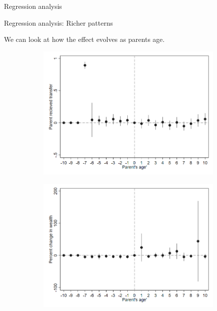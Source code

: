 \documentclass[10pt]{beamer}
\begin{document}
\begin{frame}{Regression analysis}
    \begin{adjustbox}{width=.9\textwidth}
    
    \end{adjustbox}
    
\end{frame}

\begin{frame}{Regression analysis: Richer patterns}

We can look at how the effect evolves as parents age. 

\begin{figure}[h!]
\begin{subfigure}[t]{.48\textwidth}
  \includegraphics[width=\textwidth]{OLS_Transfer.png}
\end{subfigure}%
\hfill
\begin{subfigure}[t]{.48\textwidth}
  \includegraphics[width=\textwidth]{OLS_ChangeWealth.png}
\end{subfigure}%
\end{figure}%
    
\end{frame}
\end{document}
